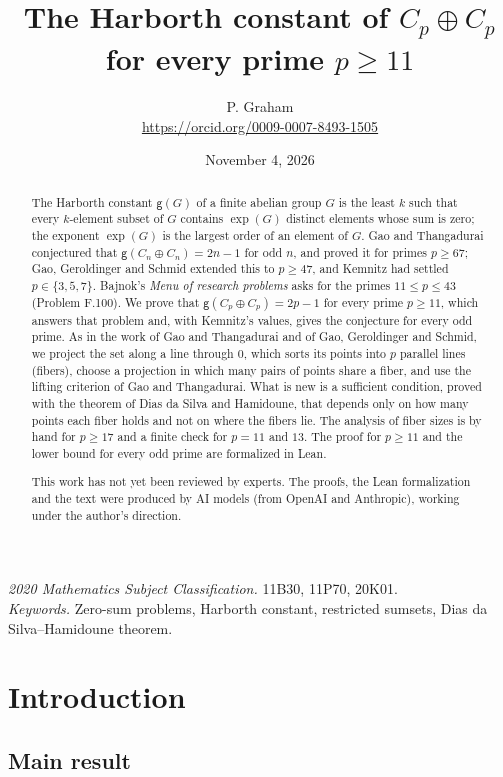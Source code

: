 \documentclass[11pt]{article}
\title{The Harborth constant of $C_p\oplus C_p$ for every prime $p\ge 11$}
\author{P. Graham\\ \small\url{https://orcid.org/0009-0007-8493-1505}}
\date{November 4, 2026}
\theoremstyle{remark}
\begin{document}
\maketitle
\begin{abstract}
The Harborth constant $\mathsf g(G)$ of a finite abelian group $G$ is the least $k$ such that every $k$-element subset of $G$ contains $\exp(G)$ distinct elements whose sum is zero; the exponent $\exp(G)$ is the largest order of an element of $G$. Gao and Thangadurai conjectured that $\mathsf g(C_n\oplus C_n)=2n-1$ for odd $n$, and proved it for primes $p\ge 67$; Gao, Geroldinger and Schmid extended this to $p\ge47$, and Kemnitz had settled $p\in\{3,5,7\}$. Bajnok's \emph{Menu of research problems} asks for the primes $11\le p\le 43$ (Problem F.100). We prove that $\mathsf g(C_p\oplus C_p)=2p-1$ for every prime $p\ge11$, which answers that problem and, with Kemnitz's values, gives the conjecture for every odd prime. As in the work of Gao and Thangadurai and of Gao, Geroldinger and Schmid, we project the set along a line through $0$, which sorts its points into $p$ parallel lines (fibers), choose a projection in which many pairs of points share a fiber, and use the lifting criterion of Gao and Thangadurai. What is new is a sufficient condition, proved with the theorem of Dias da Silva and Hamidoune, that depends only on how many points each fiber holds and not on where the fibers lie. The analysis of fiber sizes is by hand for $p\ge17$ and a finite check for $p=11$ and $13$. The proof for $p\ge11$ and the lower bound for every odd prime are formalized in Lean.

This work has not yet been reviewed by experts. The proofs, the Lean formalization and the text were produced by AI models (from OpenAI and Anthropic), working under the author's direction.
\end{abstract}
\medskip
\noindent\textit{2020 Mathematics Subject Classification.} 11B30, 11P70, 20K01.\\
\textit{Keywords.} Zero-sum problems, Harborth constant, restricted sumsets, Dias da Silva--Hamidoune theorem.

\section{Introduction}

\subsection{Main result}
\end{document}
